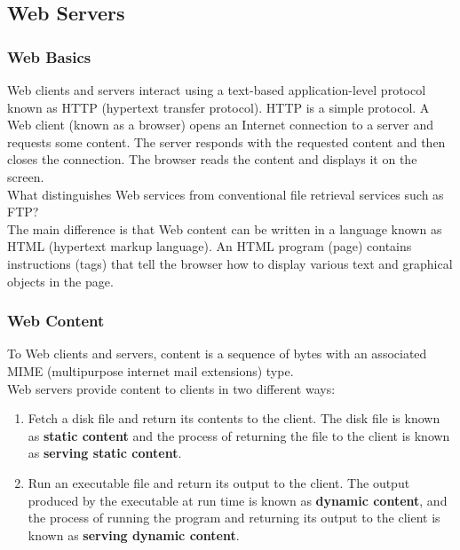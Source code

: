 \documentclass[11pt]{article}
\begin{document}
\subsection{Web Servers}
\label{sec:orgd8f66d8}

\subsubsection{Web Basics}
\label{sec:orgd4b4792}
Web clients and servers interact using a text-based application-level protocol known as HTTP (hypertext transfer protocol). HTTP is a simple protocol. A Web client (known as a browser) opens an Internet connection to a server and requests some content. The server responds with the requested content and then closes the connection. The browser reads the content and displays it on the screen.\\


What distinguishes Web services from conventional file retrieval services such as FTP?\\
The main difference is that Web content can be written in a language known as HTML (hypertext markup language). An HTML program (page) contains instructions (tags) that tell the browser how to display various text and graphical objects in the page.\\


\subsubsection{Web Content}
\label{sec:orgaa663bb}
To Web clients and servers, content is a sequence of bytes with an associated MIME (multipurpose internet mail extensions) type.\\

Web servers provide content to clients in two different ways:\\
\begin{enumerate}
\item Fetch a disk file and return its contents to the client. The disk file is known as \textbf{static content} and the process of returning the file to the client is known as \textbf{serving static content}.\\
\item Run an executable file and return its output to the client. The output produced by the executable at run time is known as \textbf{dynamic content}, and the process of running the program and returning its output to the client is known as \textbf{serving dynamic content}.\\
\end{enumerate}
\end{document}

